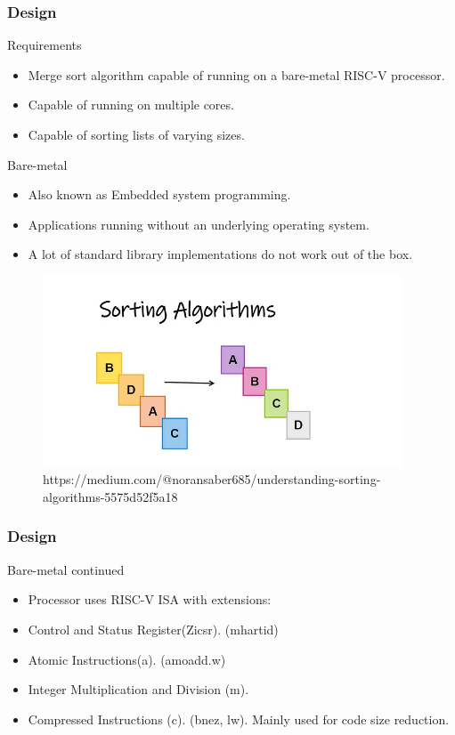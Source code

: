 \begin{frame}[hoved]
	\frametitle{Design}
	\begin{minipage}[t]{0.45\textwidth}
		{\large Requirements}
		\begin{itemize}
			\item Merge sort algorithm capable of running on a bare-metal RISC-V
			      processor.
			\item Capable of running on multiple cores.
			\item Capable of sorting lists of varying sizes.
		\end{itemize}
		{\large Bare-metal}
		\begin{itemize}
			\item Also known as Embedded system programming.
			\item Applications running without an underlying operating system.
			\item A lot of standard library implementations do not work out of the
			      box.
		\end{itemize}
	\end{minipage}
	\hfill
	\begin{minipage}[t]{0.45\textwidth}
		\begin{figure}
			\begin{center}
				\includegraphics[width=0.95\textwidth]{figures/sorting.png}
			\end{center}
			\caption{\tiny https://medium.com/@noransaber685/understanding-sorting-algorithms-5575d52f5a18}\label{fig:}
		\end{figure}
	\end{minipage}
\end{frame}


\begin{frame}[hoved]
	\frametitle{Design}
	{\large Bare-metal continued}
	\begin{itemize}
		\item Processor uses RISC-V ISA with extensions:
		\item Control and Status Register(Zicsr). (mhartid)
		\item Atomic Instructions(a). (amoadd.w)
		\item Integer Multiplication and Division (m).
		\item Compressed Instructions (c). (bnez, lw). Mainly used for code size
		      reduction.
	\end{itemize}
\end{frame}


